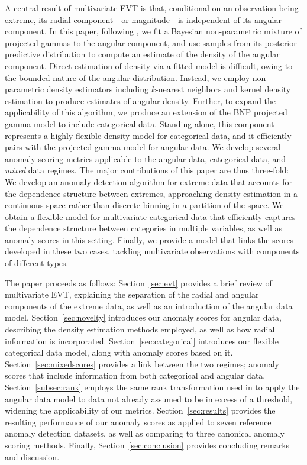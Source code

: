 A central result of multivariate EVT is that, conditional on an observation 
    being extreme, its radial component---or magnitude---is independent of its 
    angular component.  In this paper, following \cite{trubey:pg},
    we fit a Bayesian non-parametric mixture 
    of projected gammas to the angular component, and use samples from its 
    posterior predictive distribution to compute an estimate of the density 
    of the angular component.   Direct estimation of density via a fitted model
    is difficult, owing to the bounded nature of the angular distribution.  
    Instead, we employ non-parametric density estimators including $k$-nearest 
    neighbors and kernel density estimation to produce estimates of angular 
    density.  Further, to expand the applicability of this algorithm, we 
    produce an extension of the BNP projected gamma model to include categorical 
    data.   Standing alone, this component represents a highly flexible density 
    model for categorical data, and it efficiently pairs with the projected 
    gamma model for angular data.  We develop several anomaly scoring metrics 
    applicable to the angular data, categorical data, and \emph{mixed} data 
    regimes.  The major contributions of this paper are thus three-fold: We 
    develop an anomaly detection algorithm for extreme data that accounts for 
    the dependence structure between extremes, approaching density estimation 
    in a continuous space  rather than discrete binning in a partition of the 
    space. We obtain a flexible model for multivariate categorical data that 
    efficiently captures the dependence structure between categories in multiple 
    variables, as well as anomaly scores in this setting. Finally, we 
    provide a model that links the scores developed in these two cases, tackling
    multivariate observations with components of different types.

The paper proceeds as follows: Section~\ref{sec:evt} provides a 
    brief review of multivariate EVT, explaining the separation of the radial 
    and angular components of the extreme data, as well as an introduction of 
    the angular data model.  Section~\ref{sec:novelty} introduces our anomaly 
    scores for angular data, describing the density estimation methods employed, 
    as well as how radial information is incorporated.  
    Section~\ref{sec:categorical} introduces our flexible categorical data 
    model, along with anomaly scores based on it. 
    Section~\ref{sec:mixedscores} provides a link between the two regimes; 
    anomaly scores that include information from both categorical and angular 
    data.  
    Section~\ref{subsec:rank} employs the same rank transformation used in 
    \cite{goix2017} to apply the angular data model to data not already assumed 
    to be in excess of a threshold, widening the applicability of our metrics.
    Section~\ref{sec:results} provides the resulting performance of our anomaly 
    scores as applied to seven reference anomaly detection datasets, as well as 
    comparing to three canonical anomaly scoring methods.  
    Finally, Section~\ref{sec:conclusion} provides concluding remarks and discussion.

